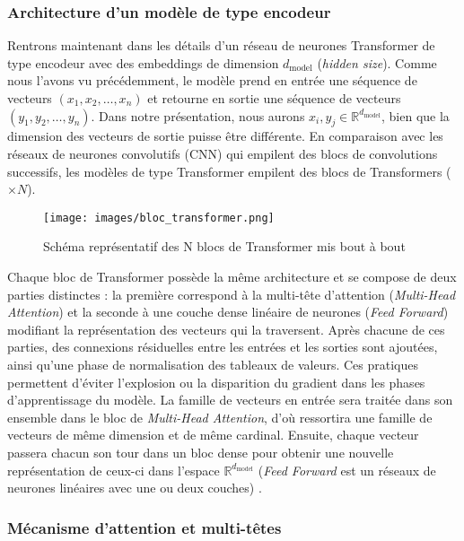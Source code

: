 \documentclass[12pt]{article}
\theoremstyle{definition}
\begin{document}
\subsubsection{Architecture d'un modèle de type encodeur}
Rentrons maintenant dans les détails d'un réseau de neurones Transformer de type encodeur avec des embeddings de dimension \(d_{\text{model}}\) (\textit{hidden size}). Comme nous l'avons vu précédemment, le modèle prend en entrée une séquence de vecteurs \((x_1, x_2, \dots, x_n)\) et retourne en sortie une séquence de vecteurs \((y_1, y_2, \dots, y_n)\). Dans notre présentation, nous aurons \(x_i, y_j \in \mathbb{R}^{d_{\text{model}}}\), bien que la dimension des vecteurs de sortie puisse être différente. En comparaison avec les réseaux de neurones convolutifs (CNN) qui empilent des blocs de convolutions successifs, les modèles de type Transformer empilent des blocs de Transformers (\(\times N\)).

\begin{figure*}[!h]
	\centering
	\texttt{[image: images/bloc\_transformer.png]}
	\caption{Schéma représentatif des N blocs de Transformer mis bout à bout}
\end{figure*}

\newpage 

 Chaque bloc de Transformer possède la même architecture et se compose de deux parties distinctes : la première correspond à la multi-tête d'attention (\textit{Multi-Head Attention}) et la seconde à une couche dense linéaire de neurones (\textit{Feed Forward}) modifiant la représentation des vecteurs qui la traversent. Après chacune de ces parties, des connexions résiduelles entre les entrées et les sorties sont ajoutées, ainsi qu'une phase de normalisation des tableaux de valeurs. Ces pratiques permettent d'éviter l'explosion ou la disparition du gradient dans les phases d'apprentissage du modèle. La famille de vecteurs en entrée sera traitée dans son ensemble dans le bloc de \textit{Multi-Head Attention}, d'où ressortira une famille de vecteurs de même dimension et de même cardinal. Ensuite, chaque vecteur passera chacun son tour dans un bloc dense pour obtenir une nouvelle représentation de ceux-ci dans l'espace \(\mathbb{R}^{d_{\text{model}}}\) (\textit{Feed Forward} est un réseaux de neurones linéaires avec une ou deux couches) .

\subsubsection{Mécanisme d'attention et multi-têtes}
\end{document}
